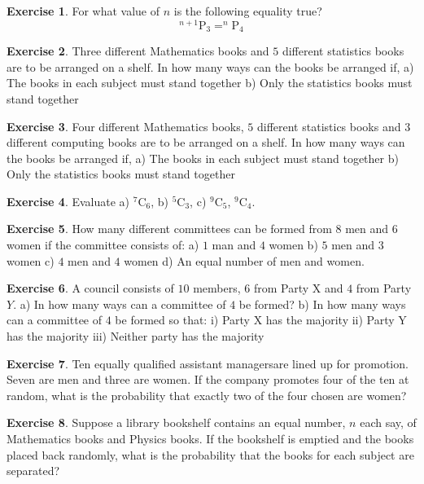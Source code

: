 \documentclass[
]{book}
\theoremstyle{definition}
\theoremstyle{definition}
\theoremstyle{definition}
\newtheorem{exercise}{Exercise}[chapter]
\theoremstyle{definition}
\theoremstyle{remark}
\begin{document}
\begin{exercise}
For what value of \(n\) is the following equality true?
\[ ^{n+1}\text{P}_3 = ^n\text{P}_4 \]
\end{exercise}

\begin{exercise}
Three different Mathematics books and \(5\) different statistics books are to be arranged on a shelf. In how many ways can the books be arranged if,
a) The books in each subject must stand together
b) Only the statistics books must stand together
\end{exercise}

\begin{exercise}
Four different Mathematics books, \(5\) different statistics books and \(3\) different computing books are to be arranged on a shelf. In how many ways can the books be arranged if,
a) The books in each subject must stand together
b) Only the statistics books must stand together
\end{exercise}

\begin{exercise}
Evaluate a) \(^7\text{C}_6\), b) \(^5\text{C}_3\), c) \(^9\text{C}_5\), \(^9\text{C}_4\).
\end{exercise}

\begin{exercise}
How many different committees can be formed from \(8\) men and \(6\) women if the committee consists of:
a) \(1\) man and \(4\) women
b) \(5\) men and \(3\) women
c) \(4\) men and \(4\) women
d) An equal number of men and women.
\end{exercise}

\begin{exercise}
A council consists of \(10\) members, \(6\) from Party X and \(4\) from Party \(Y\).
a) In how many ways can a committee of \(4\) be formed?
b) In how many ways can a committee of \(4\) be formed so that:
i) Party X has the majority
ii) Party Y has the majority
iii) Neither party has the majority
\end{exercise}

\begin{exercise}
Ten equally qualified assistant managersare lined up for promotion. Seven are men and three are women. If the company promotes four of the ten at random, what is the probability that exactly two of the four chosen are women?
\end{exercise}

\begin{exercise}
Suppose a library bookshelf contains an equal number, \(n\) each say, of Mathematics books and Physics books. If the bookshelf is emptied and the books placed back randomly, what is the probability that the books for each subject are separated?
\end{exercise}
\end{document}
